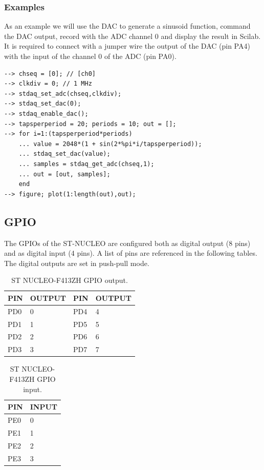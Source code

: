 \documentclass[letterpaper,10pt,english]{hitec}
\begin{document}
\subsubsection{Examples}

As an example we will use the DAC to generate a sinusoid function, command the DAC output, record with the ADC channel 0 and display the result in Scilab.
It is required to connect with a jumper wire the output of the DAC (pin PA4) with the input of the channel 0 of the ADC (pin PA0).

\begin{verbatim}
--> chseq = [0]; // [ch0]
--> clkdiv = 0; // 1 MHz
--> stdaq_set_adc(chseq,clkdiv);
--> stdaq_set_dac(0);
--> stdaq_enable_dac();
--> tapsperperiod = 20; periods = 10; out = [];
--> for i=1:(tapsperperiod*periods)
    ... value = 2048*(1 + sin(2*%pi*i/tapsperperiod));
    ... stdaq_set_dac(value);
    ... samples = stdaq_get_adc(chseq,1);
    ... out = [out, samples];
    end
--> figure; plot(1:length(out),out);
\end{verbatim}


\hrulefill

\subsection{GPIO}

The GPIOs of the ST-NUCLEO are configured both as digital output (8 pins) and as digital input (4 pins). A list of pins are referenced in the following tables.
The digital outputs are set in push-pull mode.

\begin{table}[h]
\caption{ST NUCLEO-F413ZH GPIO output.}
\centering
\begin{tabular}{|ll|ll|}
 \textbf{PIN} & \textbf{OUTPUT} & \textbf{PIN} & \textbf{OUTPUT} \\ \hline
 PD0 & 0 & PD4 & 4 \\
 PD1 & 1 & PD5 & 5 \\
 PD2 & 2 & PD6 & 6 \\
 PD3 & 3 & PD7 & 7 
\end{tabular}
\end{table}

\begin{table}[h]
\caption{ST NUCLEO-F413ZH GPIO input.}
\centering
\begin{tabular}{|ll|}
 \textbf{PIN} & \textbf{INPUT} \\ \hline
 PE0 & 0 \\
 PE1 & 1 \\
 PE2 & 2 \\
 PE3 & 3 
\end{tabular}
\end{table}
\end{document}
